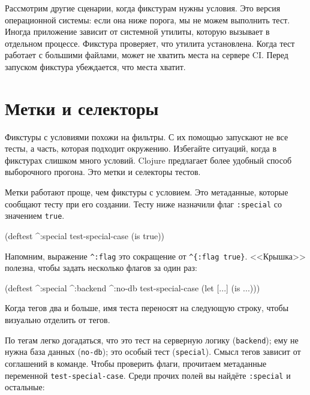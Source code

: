 Рассмотрим другие сценарии, когда фикстурам нужны условия. Это версия
операционной системы: если она ниже порога, мы не можем выполнить тест. Иногда
приложение зависит от системной утилиты, которую вызывает в отдельном
процессе. Фикстура проверяет, что утилита установлена. Когда тест работает с
большими файлами, может не хватить места на сервере CI. Перед запуском фикстура
убеждается, что места хватит.

\section{Метки и селекторы}


Фикстуры с условиями похожи на фильтры. С их помощью запускают не все тесты, а
часть, которая подходит окружению. Избегайте ситуаций, когда в фикстурах слишком
много условий. Clojure предлагает более удобный способ выборочного
прогона. Это метки и селекторы тестов.

Метки работают проще, чем фикстуры с условием. Это метаданные, которые сообщают
тесту при его создании. Тесту ниже назначили флаг \verb|:special| со значением
\verb|true|.

\begin{english}
  \begin{clojure}
(deftest ^:special test-special-case
  (is true))
  \end{clojure}
\end{english}


Напомним, выражение \verb|^:flag| это сокращение от \verb|^{:flag true}|.
<<Крышка>> полезна, чтобы задать несколько флагов за один раз:

\begin{english}
  \begin{clojure}
(deftest ^:special ^:backend ^:no-db
  test-special-case
  (let [...]
    (is ...)))
  \end{clojure}
\end{english}

\noindent
Когда тегов два и больше, имя теста переносят на следующую строку, чтобы
визуально отделить от тегов.

По тегам легко догадаться, что это тест на серверную логику (\verb|backend|);
ему не нужна база данных (\verb|no-db|); это особый тест (\verb|special|). Смысл
тегов зависит от соглашений в команде. Чтобы проверить флаги, прочитаем
метаданные переменной \verb|test-special-case|. Среди прочих полей вы найдёте
\verb|:special| и остальные:

